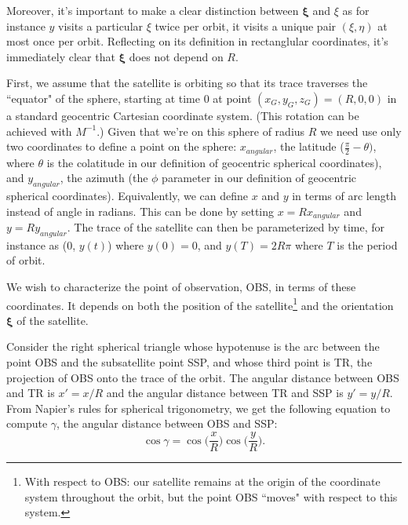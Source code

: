 \documentclass{article}
\begin{document}
Moreover, it’s important to make a clear distinction between $\bm{\xi}$ and $\xi$
as for instance $y$
visits a particular $\xi$
twice per orbit, it visits a unique pair $(\xi, \eta)$ at most once per orbit. Reflecting on its definition in rectanglular coordinates, it's immediately clear that $\bm{\xi}$ does not depend on $R$.

First, we assume that the satellite is orbiting so that its trace traverses the ``equator" of the sphere, starting at time 0 at point $(x_G,y_G,z_G) = (R,0,0)$ in a standard geocentric Cartesian coordinate system. (This rotation can be achieved with $M^{-1}$.) Given that we're on this sphere of radius $R$ we need use only two coordinates to define a point on the sphere: $x_{angular}$, the latitude ($\frac{\pi}{2} - \theta)$, where $\theta$ is the colatitude in our definition of geocentric spherical coordinates), and $y_{angular}$, the azimuth (the $\phi$ parameter in our definition of geocentric spherical coordinates). Equivalently, we can define $x$ and $y$ in terms of arc length instead of angle in radians. This can be done by setting $x = Rx_{angular}$ and $y = Ry_{angular}$.  The trace of the satellite can then be parameterized by time, for instance as (0, $y(t)$) where $y(0) = 0$, and $y(T) = 2R\pi$ where $T$ is the period of orbit.

We wish to characterize the point of observation, OBS, in terms of these coordinates. It depends on both the position of the satellite\footnote{With respect to OBS: our satellite remains at the origin of the coordinate system throughout the orbit, but the point OBS ``moves" with respect to this system.} and the orientation $\bm{\xi}$ of the satellite. 

Consider the right spherical triangle whose hypotenuse is the arc between the point OBS and the subsatellite point SSP, and whose third point is TR, the projection of OBS onto the trace of the orbit. The angular distance between OBS and TR is $x' = x/R$ and the angular distance between TR and SSP is $y' = y/R$. From Napier's rules for spherical trigonometry, we get the following equation to compute $\gamma$, the angular distance between OBS and SSP:
\begin{equation}
    \cos \gamma = \cos \big(\frac{x}{R}\big)\cos \big(\frac{y}{R}\big) \label{napier}.
\end{equation}

\end{document}
